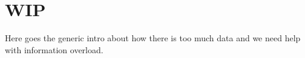 \chapter{WIP}
Here goes the generic intro about how there is too much data and we need help with information overload.